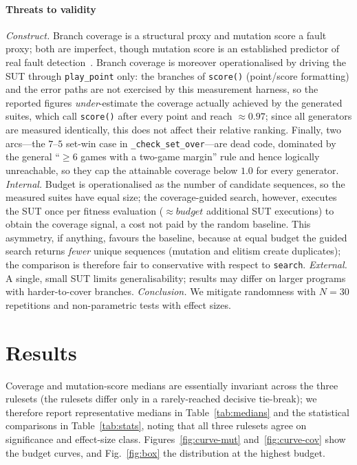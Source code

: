 \documentclass[conference]{IEEEtran}
\begin{document}
\paragraph{Threats to validity}
\emph{Construct.} Branch coverage is a structural proxy and mutation score a
fault proxy; both are imperfect, though mutation score is an established
predictor of real fault detection~\cite{just2014mutants}. Branch coverage is
moreover operationalised by driving the SUT through \texttt{play\_point} only:
the branches of \texttt{score()} (point/score formatting) and the error paths
are not exercised by this measurement harness, so the reported figures
\emph{under}-estimate the coverage actually achieved by the generated suites,
which call \texttt{score()} after every point and reach $\approx0.97$; since all
generators are measured identically, this does not affect their relative
ranking. Finally, two arcs---the $7$--$5$ set-win case in
\texttt{\_check\_set\_over}---are dead code, dominated by the general
``$\ge\!6$ games with a two-game margin'' rule and hence logically unreachable,
so they cap the attainable coverage below $1.0$ for every generator.
\emph{Internal.} Budget is operationalised as the number of candidate sequences,
so the measured suites have equal size; the coverage-guided search, however,
executes the SUT once per fitness evaluation
($\approx\!\mathit{budget}$ additional SUT executions) to obtain the coverage
signal, a cost not paid by the random baseline. This asymmetry, if anything,
favours the baseline, because at equal budget the guided search returns
\emph{fewer} unique sequences (mutation and elitism create duplicates); the
comparison is therefore fair to conservative with respect to \texttt{search}.
\emph{External.} A single, small SUT limits generalisability; results may differ
on larger programs with harder-to-cover branches.
\emph{Conclusion.} We mitigate randomness with $N{=}30$ repetitions and
non-parametric tests with effect sizes.

\section{Results}
Coverage and mutation-score medians are essentially invariant across the three
rulesets (the rulesets differ only in a rarely-reached decisive tie-break); we
therefore report representative medians in Table~\ref{tab:medians} and the
statistical comparisons in Table~\ref{tab:stats}, noting that all three rulesets
agree on significance and effect-size class. Figures~\ref{fig:curve-mut}
and~\ref{fig:curve-cov} show the budget curves, and Fig.~\ref{fig:box} the
distribution at the highest budget.
\end{document}
